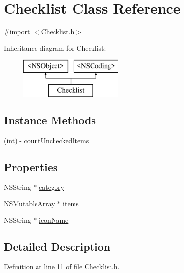 \hypertarget{interface_checklist}{\section{Checklist Class Reference}
\label{interface_checklist}
}


{\ttfamily \#import $<$Checklist.\-h$>$}

Inheritance diagram for Checklist\-:\begin{figure}[H]
\begin{center}
\leavevmode
\includegraphics[height=2.000000cm]{interface_checklist}
\end{center}
\end{figure}
\subsection*{Instance Methods}
\begin{DoxyCompactItemize}
\item 
(int) -\/ \hyperlink{interface_checklist_af8f8db387f43672302c884da166970e7}{count\-Unchecked\-Items}
\end{DoxyCompactItemize}
\subsection*{Properties}
\begin{DoxyCompactItemize}
\item 
N\-S\-String $\ast$ \hyperlink{interface_checklist_a931471409ea66fc66070c83de87b081d}{category}
\item 
N\-S\-Mutable\-Array $\ast$ \hyperlink{interface_checklist_a4be406e9e0444c9a3691c8ea776a855a}{items}
\item 
N\-S\-String $\ast$ \hyperlink{interface_checklist_a8cf1d13a9c2780d67fca7df8e02864c4}{icon\-Name}
\end{DoxyCompactItemize}


\subsection{Detailed Description}


Definition at line 11 of file Checklist.\-h.



